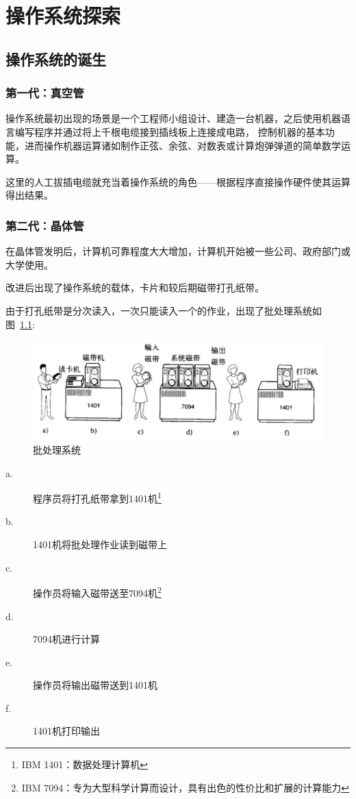 \chapter{操作系统探索}

\section{操作系统的诞生}

\subsection{第一代：真空管}

操作系统最初出现的场景是一个工程师小组设计、建造一台机器，之后使用机器语言编写程序并通过将上千根电缆接到插线板上连接成电路，
控制机器的基本功能，进而操作机器运算诸如制作正弦、余弦、对数表或计算炮弹弹道的简单数学运算。

这里的人工拔插电缆就充当着操作系统的角色——根据程序直接操作硬件使其运算得出结果。


\subsection{第二代：晶体管}

在晶体管发明后，计算机可靠程度大大增加，计算机开始被一些公司、政府部门或大学使用。

改进后出现了操作系统的载体，卡片和较后期磁带打孔纸带。

由于打孔纸带是分次读入，一次只能读入一个的作业，出现了批处理系统如图~\ref{fig:btss}: 

\begin{figure}[h]
  \centering
  \includegraphics[width=.8\textwidth]{fig/btss.png}
  \caption{批处理系统}
  \label{fig:btss}
\end{figure}

\begin{description}
\item[a.]程序员将打孔纸带拿到1401机\footnote{IBM 1401：数据处理计算机\cite{1401dps}}
\item[b.]1401机将批处理作业读到磁带上
\item[c.]操作员将输入磁带送至7094机\footnote{IBM 7094：专为大型科学计算而设计，具有出色的性价比和扩展的计算能力\cite{7094dps}}
\item[d.]7094机进行计算
\item[e.]操作员将输出磁带送到1401机
\item[f.]1401机打印输出
\end{description}

